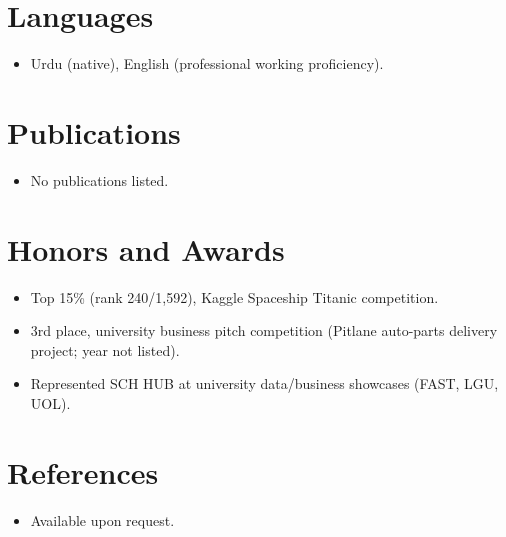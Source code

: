 \documentclass[11pt,a4paper,sans]{moderncv}
\begin{document}

\section{Languages}
\vspace{1pt}
\begin{itemize}
\item Urdu (native), English (professional working proficiency).
\end{itemize}


\section{Publications}
\vspace{1pt}
\begin{itemize}
\item No publications listed.
\end{itemize}


\section{Honors and Awards}
\vspace{1pt}
\begin{itemize}
\item Top 15\% (rank 240/1,592), Kaggle Spaceship Titanic competition.
\item 3rd place, university business pitch competition (Pitlane auto-parts delivery project; year not listed).
\item Represented SCH HUB at university data/business showcases (FAST, LGU, UOL).
\end{itemize}


\section{References}
\vspace{1pt}
\begin{itemize}
\item{Available upon request.}
\end{itemize}
\end{document}
